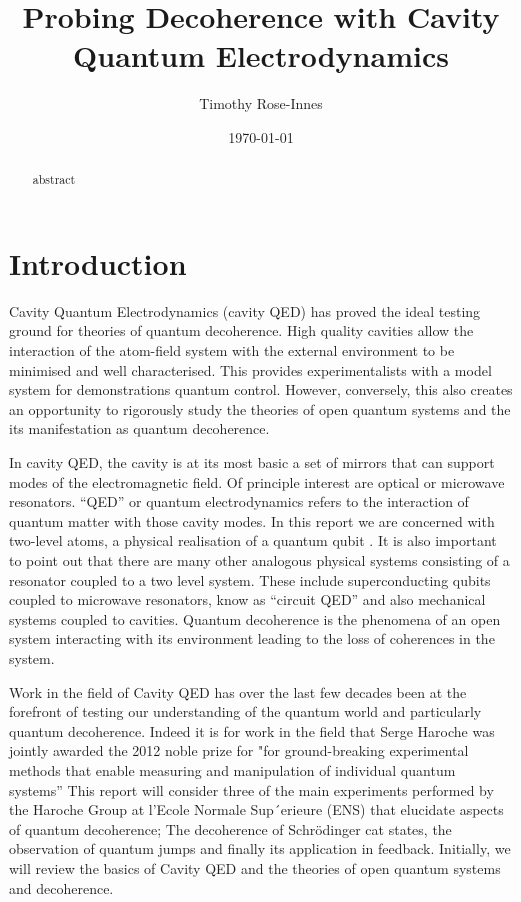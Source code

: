 \documentclass[aps,prl,twocolumn,amsmath,amssymb]{revtex4}
\begin{document}
\title{Probing Decoherence with Cavity Quantum Electrodynamics}%
\author{Timothy Rose-Innes} %
\date{\today}%
\begin{abstract}
abstract
\end{abstract}
\maketitle

\section{\label{sec:level1}Introduction}

Cavity Quantum Electrodynamics (cavity QED) has proved the ideal testing ground for theories of quantum decoherence.  High quality cavities allow the interaction of the atom-field system with the external environment to be minimised and well characterised. This provides experimentalists with a model system for demonstrations quantum control. However, conversely, this also creates an opportunity to rigorously study the theories of open quantum systems and the its manifestation as quantum decoherence.
 
In cavity QED, the cavity is at its most basic a set of mirrors that can support modes of the electromagnetic field. Of principle interest are optical or microwave resonators.  “QED” or quantum electrodynamics refers to the interaction of quantum matter with those cavity modes. In this report we are concerned with two-level atoms, a physical realisation of a quantum qubit . It is also important to point out that there are many other analogous physical systems consisting of a resonator coupled to a two level system. These include superconducting qubits coupled to microwave resonators, know as “circuit QED”  and also mechanical systems coupled to cavities.  Quantum decoherence is the phenomena of an open system interacting with its environment  leading to the loss of coherences in the system.

Work in the field of Cavity QED has over the last few decades been at the forefront of testing our understanding of the quantum world and particularly quantum decoherence. Indeed it is for work in the field that Serge Haroche was jointly  awarded the 2012 noble prize for "for ground-breaking experimental methods that enable measuring and manipulation of individual quantum systems'' This report will consider three of the main experiments performed by the Haroche Group at l’Ecole Normale
Sup´erieure (ENS) that elucidate aspects of quantum decoherence; The decoherence of Schrödinger cat states, the observation of quantum jumps and finally its application in  feedback. Initially, we will review the basics of Cavity QED and the theories of open quantum systems and decoherence.
\end{document}
